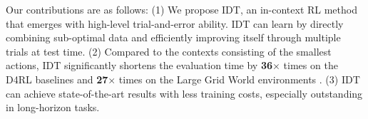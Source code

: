 Our contributions are as follows: (1) We propose IDT, an in-context RL method that emerges with high-level trial-and-error ability. IDT can learn by directly combining sub-optimal data and efficiently improving itself through multiple trials at test time. (2) Compared to the contexts consisting of the smallest actions, IDT significantly shortens the evaluation time by \textbf{36$\bm\times$} times on the D4RL baselines \cite{13} and \textbf{27$\bm\times$} times on the Large Grid World environments \cite{14}. 
(3) IDT can achieve state-of-the-art results with less training costs, especially outstanding in long-horizon tasks. 




